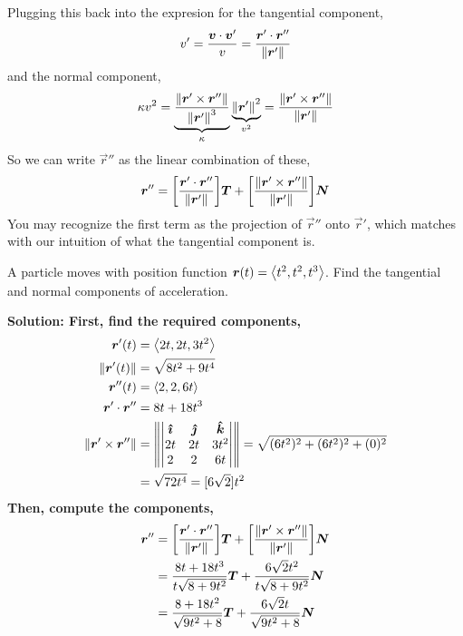 Plugging this back into the expresion for the tangential component,
\[ v' = \frac{\boldsymbol{v}\cdot \boldsymbol{v}'}{v} = \frac{\boldsymbol{r}' \cdot \boldsymbol{r}''}{\norm{\boldsymbol{r}'}}\]
and the normal component,
\[ \kappa v^2 = \underbrace{\frac{\norm{\boldsymbol{r}' \times \boldsymbol{r}''}}{\norm{\boldsymbol{r}'}^3}}_{\kappa}\underbrace{\norm{\boldsymbol{r}'}^2}_{v^2} = \frac{\norm{\boldsymbol{r}'\times \boldsymbol{r}''}}{\norm{\boldsymbol{r}'}}\]
So we can write \(\vec r''\) as the linear combination of these,
\[ \vec r'' = \bqty{\frac{\vec r'\cdot \vec r''}{\norm{\vec r'}}}\vec T + \bqty{\frac{\norm{\vec r'\times \vec r''}}{\norm{\vec r'}}}\vec N\]
You may recognize the first term as the projection of \(\vec r''\) onto \(\vec r'\), which matches with our intuition of what the tangential component is. 
\begin{example}
    A particle moves with position function \(\boldsymbol{r}(t) = \left\langle t^2, t^2, t^3\right\rangle\). Find the tangential and normal components of acceleration.\par\bf{Solution: }
    First, find the required components,
    \begin{align*}
        \boldsymbol{r}'(t) &= \left\langle2t, 2t, 3t^2\right\rangle \\
        \norm{\boldsymbol{r}'(t)} &= \sqrt{8t^2+9t^4} \\
        \boldsymbol{r}''(t) &= \left\langle 2, 2, 6t\right\rangle \\
        \boldsymbol{r}' \cdot \boldsymbol{r}'' &= 8t+18t^3 \\
        \norm{\boldsymbol{r}'\times \boldsymbol{r}''} &= \norm{\begin{vmatrix}
            \boldsymbol{\hat{\imath}} & \boldsymbol{\hat{\jmath}} & \boldsymbol{\hat{k}} \\
            2t & 2t & 3t^2 \\
            2 & 2 & 6t
        \end{vmatrix}} = \sqrt{(6t^2)^2 + (6t^2)^2 + (0)^2} \\
        &= \sqrt{72t^4} = [6\sqrt 2]t^2
    \end{align*}
    Then, compute the components,
    \begin{align*}
        \vec r'' &= \bqty{\frac{\vec r'\cdot \vec r''}{\norm{\vec r'}}}\vec T + \bqty{\frac{\norm{\vec r'\times\vec r''}}{\norm{\vec r'}}}\vec N \\
        &= \frac{8t+18t^3}{t\sqrt{8+9t^2}}\vec T + \frac{6\sqrt 2t^2}{t\sqrt{8+9t^2}}\vec N \\
        &= \frac{8+18t^2}{\sqrt{9t^2+8}}\vec T + \frac{6\sqrt 2 t}{\sqrt{9t^2+8}}\vec N
    \end{align*}
\end{example}